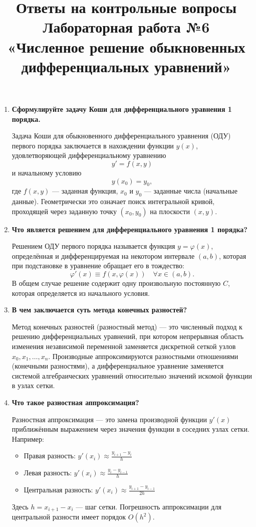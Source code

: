 \documentclass[a4paper,12pt]{article}
\begin{document}
\title{Ответы на контрольные вопросы \\
Лабораторная работа №6 \\
«Численное решение обыкновенных дифференциальных уравнений»}
\author{}
\date{}
\maketitle

\begin{enumerate}

\item \textbf{Сформулируйте задачу Коши для дифференциального уравнения 1 порядка.}

Задача Коши для обыкновенного дифференциального уравнения (ОДУ) первого порядка заключается в нахождении функции \( y(x) \), удовлетворяющей дифференциальному уравнению
\[
y' = f(x, y)
\]
и начальному условию
\[
y(x_0) = y_0,
\]
где \( f(x, y) \) — заданная функция, \( x_0 \) и \( y_0 \) — заданные числа (начальные данные). Геометрически это означает поиск интегральной кривой, проходящей через заданную точку \( (x_0, y_0) \) на плоскости \( (x, y) \).

\item \textbf{Что является решением для дифференциального уравнения 1 порядка?}

Решением ОДУ первого порядка называется функция \( y = \varphi(x) \), определённая и дифференцируемая на некотором интервале \( (a, b) \), которая при подстановке в уравнение обращает его в тождество:
\[
\varphi'(x) \equiv f(x, \varphi(x)) \quad \forall x \in (a, b).
\]
В общем случае решение содержит одну произвольную постоянную \( C \), которая определяется из начального условия.

\item \textbf{В чем заключается суть метода конечных разностей?}

Метод конечных разностей (разностный метод) — это численный подход к решению дифференциальных уравнений, при котором непрерывная область изменения независимой переменной заменяется дискретной сеткой узлов \( x_0, x_1, \dots, x_n \). Производные аппроксимируются разностными отношениями (конечными разностями), а дифференциальное уравнение заменяется системой алгебраических уравнений относительно значений искомой функции в узлах сетки.

\item \textbf{Что такое разностная аппроксимация?}

Разностная аппроксимация — это замена производной функции \( y'(x) \) приближённым выражением через значения функции в соседних узлах сетки. Например:
\begin{itemize}
    \item Правая разность: \( y'(x_i) \approx \frac{y_{i+1} - y_i}{h} \)
    \item Левая разность: \( y'(x_i) \approx \frac{y_i - y_{i-1}}{h} \)
    \item Центральная разность: \( y'(x_i) \approx \frac{y_{i+1} - y_{i-1}}{2h} \)
\end{itemize}
Здесь \( h = x_{i+1} - x_i \) — шаг сетки. Погрешность аппроксимации для центральной разности имеет порядок \( O(h^2) \).


\end{enumerate}
\end{document}

